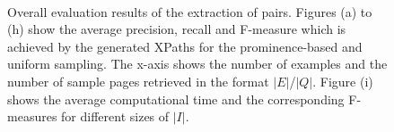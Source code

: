 \begin{figure}[htb!]
        ~
        ~
\caption{Overall evaluation results of the extraction of pairs. Figures (a) to (h) show the average precision, recall and F-measure which is achiev\-ed by the generated XPaths for the prominence-based and uniform sampling. The x-axis shows the number of examples and the number of sample pages retrieved in the format $|E|$/$|Q|$. Figure (i) shows the average computational time and the corresponding F-measures for different sizes of $|I|$.}
\label{charex:fig:overall-XPaths}
\end{figure}


